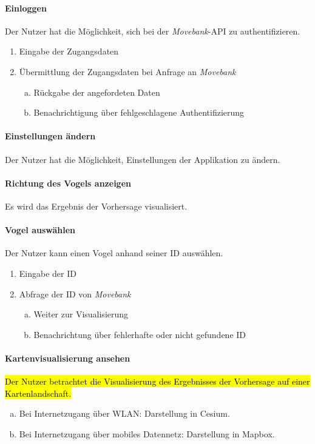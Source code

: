 \documentclass[12pt]{article} %
\newenvironment{cptenumerate}[1][label=\arabic*.]{\begin{enumerate}[#1] \setlength\itemsep{0em}}{\end{enumerate}}
\begin{document}
\paragraph{Einloggen} Der Nutzer hat die Möglichkeit, sich bei der \textit{Movebank}-API zu authentifizieren.
\begin{cptenumerate} 
  	 \item Eingabe der Zugangsdaten
  	 \item Übermittlung der Zugangsdaten bei Anfrage an \textit{Movebank}
  	 \begin{cptenumerate}[a.]
  	  	 \item Rückgabe der angefordeten Daten
  	  	 \item Benachrichtigung über fehlgeschlagene Authentifizierung
  	 \end{cptenumerate} 
 \end{cptenumerate}  

 \paragraph{Einstellungen ändern} Der Nutzer hat die Möglichkeit, Einstellungen der Applikation zu ändern.

 \paragraph{Richtung des Vogels anzeigen} Es wird das Ergebnis der Vorhersage visualisiert.

 \paragraph{Vogel auswählen} Der Nutzer kann einen Vogel anhand seiner ID auswählen.
 \begin{cptenumerate} 
     	 \item Eingabe der ID
     	 \item Abfrage der ID von \textit{Movebank}
     	 \begin{cptenumerate}[a.]
     	   	 \item Weiter zur Visualisierung
     	   	 \item Benachrichtung über fehlerhafte oder nicht gefundene ID
     	  \end{cptenumerate}  
    \end{cptenumerate}    

\paragraph{Kartenvisualisierung ansehen} \hl{Der Nutzer betrachtet die Visualisierung des Ergebnisses der Vorhersage auf einer Kartenlandschaft.} 
\begin{cptenumerate}[a.]
 	 \item Bei Internetzugang über WLAN: Darstellung in Cesium.
 	 \item Bei Internetzugang über mobiles Datennetz: Darstellung in Mapbox. 
\end{cptenumerate}
\end{document}
